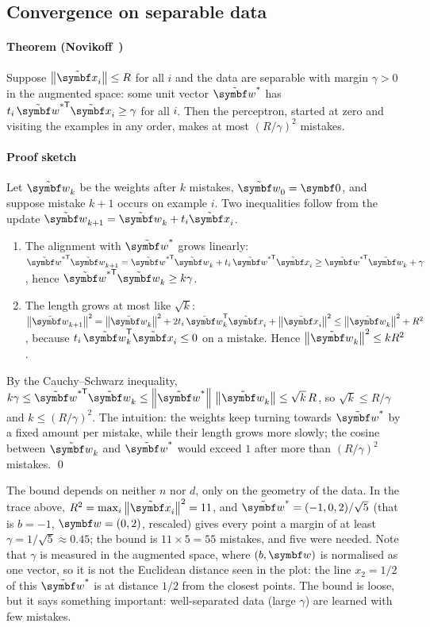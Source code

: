 \documentclass[11pt]{article}
\newcommand{\w}{\vect{w}}
\newcommand{\xt}{\tilde{\x}}
\newcommand{\wt}{\tilde{\w}}
\begin{document}
\subsection{Convergence on separable data}

\paragraph{Theorem (Novikoff~\cite{novikoff1962})} Suppose $\norm{\xt_i} \le R$ for all $i$ and the data are separable
with margin $\gamma > 0$ in the augmented space: some unit vector $\wt^*$ has $t_i\,\wt^{*\mathsf T}\xt_i \ge \gamma$ for
all $i$. Then the perceptron, started at zero and visiting the examples in any order, makes at most $(R/\gamma)^2$
mistakes.

\paragraph{Proof sketch} Let $\wt_k$ be the weights after $k$ mistakes, $\wt_0 = \vect{0}$, and suppose mistake $k+1$
occurs on example $i$. Two inequalities follow from the update $\wt_{k+1} = \wt_k + t_i\xt_i$.
\begin{enumerate}
\item The alignment with $\wt^*$ grows linearly: $\wt^{*\mathsf T}\wt_{k+1} = \wt^{*\mathsf T}\wt_k +
t_i\,\wt^{*\mathsf T}\xt_i \ge \wt^{*\mathsf T}\wt_k + \gamma$, hence $\wt^{*\mathsf T}\wt_k \ge k\gamma$.
\item The length grows at most like $\sqrt{k}$: $\norm{\wt_{k+1}}^2 = \norm{\wt_k}^2 + 2t_i\,\wt_k\T\xt_i +
\norm{\xt_i}^2 \le \norm{\wt_k}^2 + R^2$, because $t_i\,\wt_k\T\xt_i \le 0$ on a mistake. Hence $\norm{\wt_k}^2 \le kR^2$.
\end{enumerate}
By the Cauchy--Schwarz inequality, $k\gamma \le \wt^{*\mathsf T}\wt_k \le \norm{\wt^*}\,\norm{\wt_k} \le \sqrt{k}\,R$,
so $\sqrt{k} \le R/\gamma$ and $k \le (R/\gamma)^2$. The intuition: the weights keep turning towards $\wt^*$ by a fixed
amount per mistake, while their length grows more slowly; the cosine between $\wt_k$ and $\wt^*$ would exceed $1$ after
more than $(R/\gamma)^2$ mistakes. \qed

The bound depends on neither $n$ nor $d$, only on the geometry of the data. In the trace above, $R^2 = \max_i
\norm{\xt_i}^2 = 11$, and $\wt^* = (-1, 0, 2)/\sqrt5$ (that is $b = -1$, $\w = (0, 2)$, rescaled) gives every point a
margin of at least $\gamma = 1/\sqrt5 \approx 0.45$; the bound is $11 \times 5 = 55$ mistakes, and five were needed. Note
that $\gamma$ is measured in the augmented space, where $(b, \w)$ is normalised as one vector, so it is not the Euclidean
distance seen in the plot: the line $x_2 = 1/2$ of this $\wt^*$ is at distance $1/2$ from the closest points. The bound is
loose, but it says something important: well-separated data (large $\gamma$) are learned with few mistakes.
\end{document}
